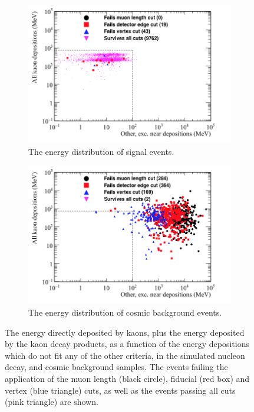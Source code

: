 \begin{figure}
  \centering
  \begin{subfigure}{0.8\textwidth}
    \includegraphics[width=\textwidth]{NucleonDecay_AllKaon_vs_Other_Can}
    \caption{The energy distribution of signal events.}
    \label{fig:NDK_AllKaon_Other_EDist_Sig}
  \end{subfigure}
  \begin{subfigure}{0.8\textwidth}
    \includegraphics[width=\textwidth]{CosmicBackground_AllKaon_vs_Other_Can}
    \caption{The energy distribution of cosmic background events.}
    \label{fig:NDK_AllKaon_Other_EDist_Cosmo}
  \end{subfigure}
  \caption[The energy directly deposited by kaons, plus the energy deposited by the kaon decay products, as a function of the energy depositions which do not fit any of the other criteria, in the simulated nucleon decay, and cosmic background samples]
          {The energy directly deposited by kaons, plus the energy deposited by the kaon decay products, as a function of the energy depositions which do not fit any of the other criteria, in the simulated nucleon decay, and cosmic background samples. The events failing the application of the muon length (black circle), fiducial (red box) and vertex (blue triangle) cuts, as well as the events passing all cuts (pink triangle) are shown.}
  \label{fig:NDK_AllKaon_Other_EDist}
\end{figure}

